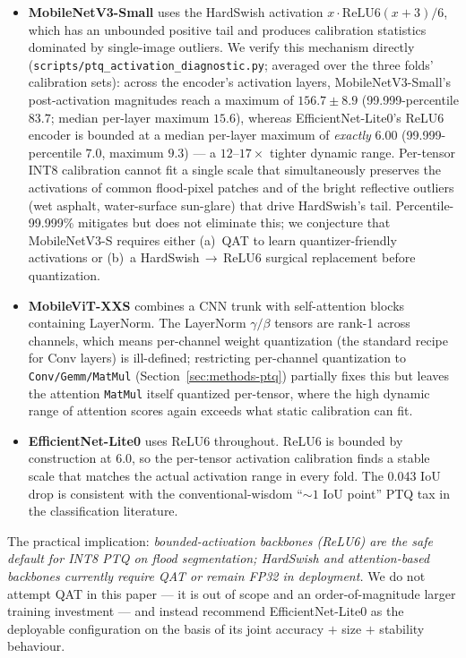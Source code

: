 \begin{itemize}
\item \textbf{MobileNetV3-Small} uses the HardSwish activation $x \cdot \mathrm{ReLU6}(x+3)/6$, which has an unbounded positive tail and produces calibration statistics dominated by single-image outliers. We verify this mechanism directly (\texttt{scripts/ptq\_activation\_diagnostic.py}; averaged over the three folds' calibration sets): across the encoder's activation layers, MobileNetV3-Small's post-activation magnitudes reach a maximum of $156.7 \pm 8.9$ (99.999-percentile $83.7$; median per-layer maximum $15.6$), whereas EfficientNet-Lite0's ReLU6 encoder is bounded at a median per-layer maximum of \emph{exactly} $6.00$ (99.999-percentile $7.0$, maximum $9.3$) --- a $12$--$17\times$ tighter dynamic range. Per-tensor INT8 calibration cannot fit a single scale that simultaneously preserves the activations of common flood-pixel patches and of the bright reflective outliers (wet asphalt, water-surface sun-glare) that drive HardSwish's tail. Percentile-99.999\% mitigates but does not eliminate this; we conjecture that MobileNetV3-S requires either (a)~QAT to learn quantizer-friendly activations or (b)~a HardSwish\,$\rightarrow$\,ReLU6 surgical replacement before quantization.
\item \textbf{MobileViT-XXS} combines a CNN trunk with self-attention blocks containing LayerNorm. The LayerNorm $\gamma / \beta$ tensors are rank-1 across channels, which means per-channel weight quantization (the standard recipe for Conv layers) is ill-defined; restricting per-channel quantization to \texttt{Conv/Gemm/MatMul} (Section~\ref{sec:methods-ptq}) partially fixes this but leaves the attention \texttt{MatMul} itself quantized per-tensor, where the high dynamic range of attention scores again exceeds what static calibration can fit.
\item \textbf{EfficientNet-Lite0} uses ReLU6 throughout. ReLU6 is bounded by construction at 6.0, so the per-tensor activation calibration finds a stable scale that matches the actual activation range in every fold. The 0.043 IoU drop is consistent with the conventional-wisdom ``$\sim 1$ IoU point'' PTQ tax in the classification literature.
\end{itemize}

The practical implication: \emph{bounded-activation backbones (ReLU6) are the safe default for INT8 PTQ on flood segmentation; HardSwish and attention-based backbones currently require QAT or remain FP32 in deployment.} We do not attempt QAT in this paper --- it is out of scope and an order-of-magnitude larger training investment --- and instead recommend EfficientNet-Lite0 as the deployable configuration on the basis of its joint accuracy $+$ size $+$ stability behaviour.

